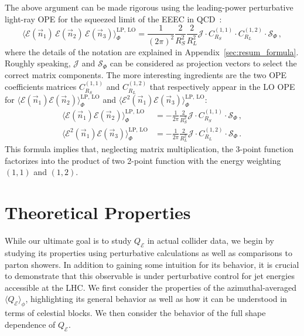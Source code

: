 \documentclass[letterpaper,11pt]{article}
\def\beq{\begin{equation}}
\def\eeq{\end{equation}}
\def\App#1{Appendix~\ref{#1}}
\DeclareRobustCommand{\App}[1]{App.~\ref{#1}}
\def\cE{\mathcal{E}}
\def\cE{\mathcal{E}}
\begin{document}
The above argument can be made rigorous using the leading-power perturbative light-ray OPE for the squeezed limit of the EEEC in QCD~\cite{Chen:2020adz,Chen:2021gdk}:
\beq
\langle\mathcal{E}(\vec{n}_1) \, \mathcal{E}(\vec{n}_2) \, \mathcal{E}(\vec{n}_3)\rangle_\Phi^{\mathrm{LP,\, LO}}
=\frac{1}{(2\pi)^2} \frac{2}{R_S^2}\frac{2}{R_L^2} {\mathcal{J}}\cdot {C}_{R_S}^{(1,1)}
\cdot {C}_{R_L}^{(1,2)}
\cdot \mathcal{S}_\Phi\,,
\eeq
where the details of the notation are explained in \App{sec:resum_formula}.
%
Roughly speaking, $\mathcal{J}$ and $\mathcal{S}_\Phi$ can be considered as projection vectors to select the correct matrix components.
%
The more interesting ingredients are the two OPE coefficients matrices $C_{R_S}^{(1,1)}$ and $C_{R_L}^{(1,2)}$ that respectively appear in the LO OPE for $\langle\mathcal{E}(\vec{n}_1)\mathcal{E}(\vec{n}_2)\rangle_\Phi^{\mathrm{LP,\, LO}}$ and $\langle\mathcal{E}^2(\vec{n}_1)\mathcal{E}(\vec{n}_3)\rangle_\Phi^{\mathrm{LP,\, LO}}$:
%
\begin{align}
\langle\mathcal{E}(\vec{n}_1)\mathcal{E}(\vec{n}_2)\rangle_\Phi^{\mathrm{LP,\, LO}} 
&= -\frac{1}{2\pi} \frac{2}{R_S^2} \mathcal{J} \cdot C_{R_S}^{(1,1)} \cdot \mathcal{S}_\Phi\,, \\
\langle\mathcal{E}^2(\vec{n}_1)\mathcal{E}(\vec{n}_3)\rangle_\Phi^{\mathrm{LP,\, LO}}
&= -\frac{1}{2\pi} \frac{2}{R_L^2} \mathcal{J} \cdot C_{R_L}^{(1,2)} \cdot \mathcal{S}_\Phi\,. 
\end{align}
%
 This formula implies that, neglecting matrix multiplication, the 3-point function factorizes into the product of two 2-point function with the energy weighting $(1,1)$ and $(1,2)$. 


\section{Theoretical Properties}
\label{sec:NG_analytic}


While our ultimate goal is to study $Q_{\cE}$ in actual collider data, we begin by studying its properties using perturbative calculations as well as comparisons to parton showers.
%
In addition to gaining some intuition for its behavior, it is crucial to demonstrate that this observable is under perturbative control for jet energies accessible at the LHC.
%
We first consider the properties of the azimuthal-averaged $\langle Q_\cE \rangle_\phi$, highlighting its general behavior as well as how it can be understood in terms of celestial blocks.
%
We then consider the behavior of the full shape dependence of $Q_\cE$.
\end{document}
